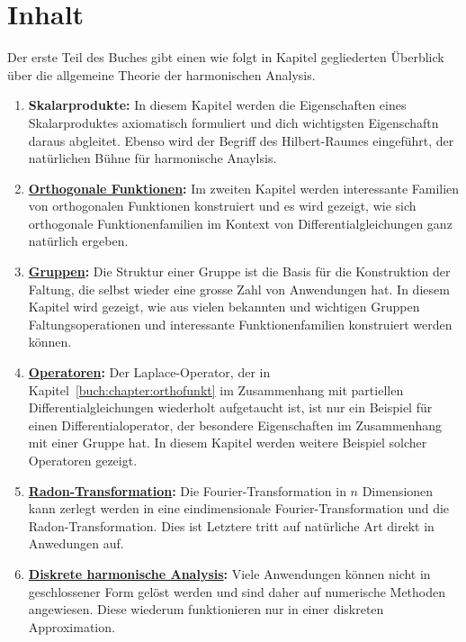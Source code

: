 %
%
%
\section{Inhalt
\label{buch:einleitung:section:inhalt}}
Der erste Teil des Buches gibt einen wie folgt in Kapitel gegliederten
Überblick über die allgemeine Theorie der harmonischen Analysis.

\begin{enumerate}
\item {\bf Skalarprodukte:}
In diesem Kapitel werden die Eigenschaften eines Skalarproduktes 
axiomatisch formuliert und dich wichtigsten Eigenschaftn daraus
abgleitet.
Ebenso wird der Begriff des Hilbert-Raumes eingeführt, der natürlichen
Bühne für harmonische Anaylsis.
\item {\bf \hyperref[buch:chapter:orthofunkt]{Orthogonale Funktionen}:}
Im zweiten Kapitel werden interessante Familien von orthogonalen
Funktionen konstruiert und es wird gezeigt, wie sich orthogonale
Funktionenfamilien im Kontext von Differentialgleichungen ganz natürlich
ergeben.
\item {\bf \hyperref[buch:chapter:gruppen]{Gruppen}:}
Die Struktur einer Gruppe ist die Basis für die Konstruktion der Faltung,
die selbst wieder eine grosse Zahl von Anwendungen hat.
In diesem Kapitel wird gezeigt, wie aus vielen bekannten und wichtigen
Gruppen Faltungsoperationen und interessante Funktionenfamilien
konstruiert werden können.
\item {\bf \hyperref[buch:chapter:operatoren]{Operatoren}:}
Der Laplace-Operator, der in Kapitel~\ref{buch:chapter:orthofunkt}
im Zusammenhang mit partiellen Differentialgleichungen wiederholt
aufgetaucht ist, ist nur ein Beispiel für einen Differentialoperator,
der besondere Eigenschaften im Zusammenhang mit einer Gruppe hat.
In diesem Kapitel werden weitere Beispiel solcher Operatoren gezeigt.
\item {\bf \hyperref[buch:chapter:radon]{Radon-Transformation}:}
Die Fourier-Transformation in $n$ Dimensionen kann zerlegt werden in
eine eindimensionale Fourier-Transformation und die Radon-Transformation.
Dies ist 
Letztere tritt auf natürliche Art direkt in Anwedungen auf.
\item {\bf \hyperref[buch:chapter:diskret]{Diskrete harmonische Analysis}:}
Viele Anwendungen können nicht in geschlossener Form gelöst werden
und sind daher auf numerische Methoden angewiesen.
Diese wiederum funktionieren nur in einer diskreten Approximation.

\end{enumerate}
